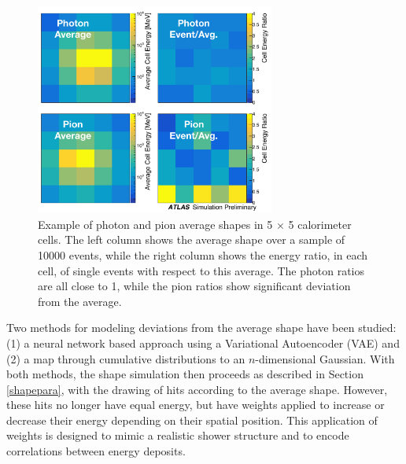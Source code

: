 \begin{figure}[ht!]
\centering
\includegraphics[width=0.7\textwidth]{figures/approved-example-pion-photon-ave-ratios-ATLASstyle.pdf}
\caption{Example of photon and pion average shapes in 5 $\times$ 5 calorimeter cells. The left column shows the average shape over a sample of 10000 events, while the right column shows the energy ratio, in each cell, of single \GEANT events with respect to this average. The photon ratios are all close to 1, while the pion ratios show significant deviation from the average.}
\label{fig-2}       %
\end{figure}

Two methods for modeling deviations from the average shape have been studied: 
(1) a neural network based approach using a Variational 
Autoencoder (VAE) \cite{VAE} and (2) a map through cumulative distributions to an $n$-dimensional Gaussian. 
With both methods, the shape simulation then proceeds as described in Section \ref{shapepara}, with the drawing of hits 
according to the average shape. However, these hits no longer have equal energy, but have weights applied to increase or 
decrease their energy depending on their spatial position. This application of weights is designed to mimic a realistic 
shower structure and to encode correlations between energy deposits.

